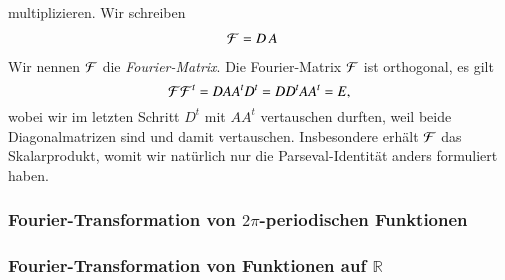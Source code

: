 multiplizieren.
Wir schreiben
\begin{align*}
{\cal F}
&=
D\, A
\end{align*}
Wir nennen $\cal F$ die {\em Fourier-Matrix}.
%
Die Fourier-Matrix $\cal F$ ist orthogonal, es gilt
\[
{\cal F}{\cal F}^t
=
DAA^tD^t
=
DD^tAA^t
=
E,
\]
wobei wir im letzten Schritt $D^t$ mit $AA^t$ vertauschen durften,
weil beide Diagonalmatrizen sind und damit vertauschen.
Insbesondere erhält $\cal F$ das Skalarprodukt, womit wir natürlich
nur die Parseval-Identität anders formuliert haben.




\subsubsection{Fourier-Transformation von $2\pi$-periodischen Funktionen}

\subsubsection{Fourier-Transformation von Funktionen auf $\mathbb R$}






